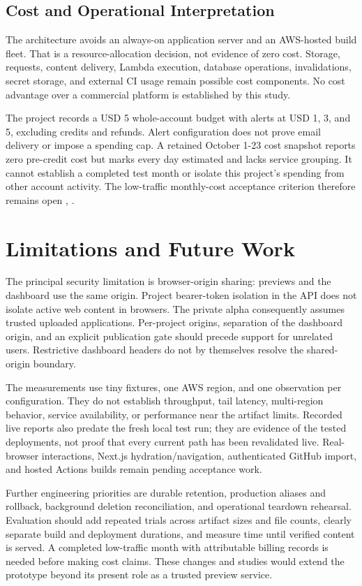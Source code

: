 \documentclass[conference,letterpaper]{IEEEtran}
\begin{document}
\subsection{Cost and Operational Interpretation}
The architecture avoids an always-on application server and an AWS-hosted build fleet. That is a resource-allocation decision, not evidence of zero cost. Storage, requests, content delivery, Lambda execution, database operations, invalidations, secret storage, and external CI usage remain possible cost components. No cost advantage over a commercial platform is established by this study.

The project records a USD 5 whole-account budget with alerts at USD 1, 3, and 5, excluding credits and refunds. Alert configuration does not prove email delivery or impose a spending cap. A retained October 1-23 cost snapshot reports zero pre-credit cost but marks every day estimated and lacks service grouping. It cannot establish a completed test month or isolate this project's spending from other account activity. The low-traffic monthly-cost acceptance criterion therefore remains open \cite{r1}, \cite{r7}.

\section{Limitations and Future Work}
The principal security limitation is browser-origin sharing: previews and the dashboard use the same origin. Project bearer-token isolation in the API does not isolate active web content in browsers. The private alpha consequently assumes trusted uploaded applications. Per-project origins, separation of the dashboard origin, and an explicit publication gate should precede support for unrelated users. Restrictive dashboard headers do not by themselves resolve the shared-origin boundary.

The measurements use tiny fixtures, one AWS region, and one observation per configuration. They do not establish throughput, tail latency, multi-region behavior, service availability, or performance near the artifact limits. Recorded live reports also predate the fresh local test run; they are evidence of the tested deployments, not proof that every current path has been revalidated live. Real-browser interactions, Next.js hydration/navigation, authenticated GitHub import, and hosted Actions builds remain pending acceptance work.

Further engineering priorities are durable retention, production aliases and rollback, background deletion reconciliation, and operational teardown rehearsal. Evaluation should add repeated trials across artifact sizes and file counts, clearly separate build and deployment durations, and measure time until verified content is served. A completed low-traffic month with attributable billing records is needed before making cost claims. These changes and studies would extend the prototype beyond its present role as a trusted preview service.
\end{document}
